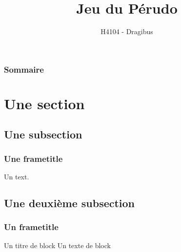 \documentclass{beamer}
\title{Jeu du Pérudo}
\author{H4104 - Dragibus}
\institute{INSA de Lyon}
\begin{document}
\begin{frame}
\titlepage
\end{frame}

\begin{frame}
\frametitle{Sommaire}
\tableofcontents[hideallsubsections]
\end{frame}

\section{Une section}

\subsection{Une subsection}

\begin{frame}
\frametitle{Une frametitle}
Un text.
\end{frame}

\subsection{Une deuxième subsection}
\begin{frame}
\frametitle{Un frametitle}
\begin{block}{Un titre de block}
Un texte de block
\end{block}
\end{frame}
\end{document}
